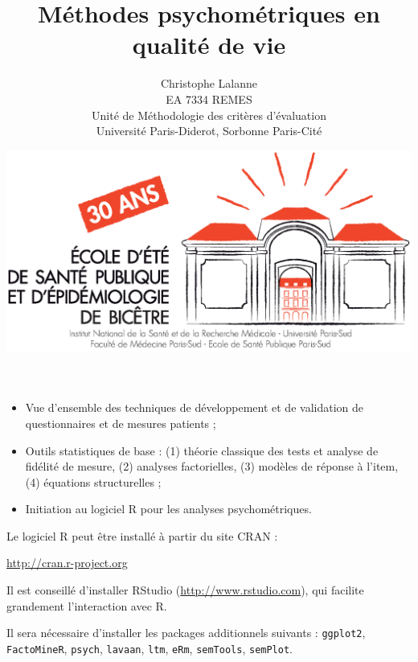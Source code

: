 

\title{Méthodes psychométriques en qualité de vie} 
\author{Christophe Lalanne\\EA 7334 REMES\\ Unité de Méthodologie des critères
  d’évaluation\\Université Paris-Diderot, Sorbonne Paris-Cité\\}
\date{\includegraphics[height=18ex]{logo.eps}}




\LogoOff
\maketitle
\rightfooter{\quad\textsf{\thepage}}




\begin{itemize}
\item Vue d'ensemble des techniques de développement et de validation de
  questionnaires et de mesures patients ;
\item Outils statistiques de base : (1) théorie classique des tests et analyse
  de fidélité de mesure, (2) analyses factorielles, (3) modèles de réponse à
  l'item, (4) équations structurelles ;
\item Initiation au logiciel R pour les analyses psychométriques.
\end{itemize}


Le logiciel R peut être installé à partir du site CRAN :\newline
{\centering \url{http://cran.r-project.org}\par} 

Il est conseillé d'installer RStudio (\url{http://www.rstudio.com}), qui
facilite grandement l'interaction avec R.

Il sera nécessaire d'installer les packages additionnels suivants :
\texttt{ggplot2}, \texttt{FactoMineR}, \texttt{psych}, \texttt{lavaan},
\texttt{ltm}, \texttt{eRm}, \texttt{semTools}, \texttt{semPlot}.



